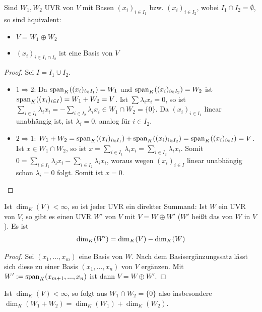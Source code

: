 \begin{proposition}
	Sind $W_1,W_2$ UVR von $V$ mit Basen $(x_i)_{i\in I_1}$ bzw. $(x_i)_{i\in I_2}$, wobei $I_1 \cap 
	I_2 = \emptyset$, so sind äquivalent:
	\begin{itemize}
		\item $V=W_1 \oplus W_2$
		\item $(x_i)_{i\in I_1 \cap I_2}$ ist eine Basis von $V$
	\end{itemize}
\end{proposition}
\begin{proof}
	Sei $I=I_1 \cup I_2$.
	\begin{itemize}
		\item $1\Rightarrow 2$: Da $\operatorname{span}_K((x_i)_{i\in I_1})=W_1$ und $\operatorname{span}_K((x_i)_{i\in I_2})=W_2$ ist $\operatorname{span}_K((x_i)
		_{i\in I})=W_1+W_2=V$. Ist $\sum \lambda_ix_i=0$, so ist $\sum_{i\in I_1} \lambda_ix_i = -\sum
		_{i\in I_2} \lambda_ix_i \in W_1 \cap W_2 = \{0\}$. Da $(x_i)_{i\in I_1}$ linear unabhängig ist, ist 
		$\lambda_i=0$, analog für $i\in I_2$.
		\item $2\Rightarrow 1$: $W_1+W_2=\operatorname{span}_K((x_i)_{i\in I_1})+\operatorname{span}_K((x_i)_{i\in I_2})=\operatorname{span}_K((x_i)_{i\in I})=V$. Ist 
		$x\in W_1 \cap W_2$, so ist $x=\sum_{i\in I_1} \lambda_ix_i = \sum_{i\in I_2} \lambda_ix_i$. Somit 
		$0=\sum_{i\in I_1} \lambda_ix_i - \sum_{i\in I_2} \lambda_ix_i$, woraus wegen $(x_i)_{i\in I}$ 
		linear unabhängig schon $\lambda_i=0$ folgt. Somit ist $x=0$.
	\end{itemize}
\end{proof}

\begin{conclusion}
	Ist $\dim_K(V)<\infty$, so ist jeder UVR ein direkter Summand: Ist $W$ ein UVR von $V$, so 
	gibt es einen UVR $W'$ von $V$ mit $V=W\oplus W'$ ($W'$ heißt das  von $W$ in $V$). Es 
	ist
	\begin{align}
		\dim_K(W')=\dim_K(V)-\dim_K(W)\notag
	\end{align}
\end{conclusion}
\begin{proof}
	Sei $(x_1,...,x_m)$ eine Basis von $W$. Nach dem Basisergänzungssatz lässt sich diese zu einer Basis $(x_1,...,x_n)$ 
	von $V$ ergänzen. Mit $W':= \operatorname{span}_K(x_{m+1},...,x_n)$ ist dann $V=W\oplus W'$.
\end{proof}

\begin{remark}
	Ist $\dim_K(V)<\infty$, so folgt aus $W_1\cap W_2=\{0\}$ also insbesondere $\dim_K(W_1+W_2)=
	\dim_K(W_1)+\dim_K(W_2)$. 
\end{remark}

